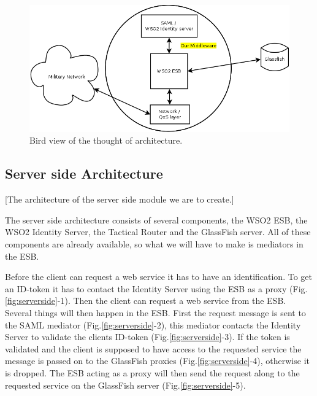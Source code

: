 \documentclass[12pt]{article}
\begin{document}
        \begin{figure}[htb]
            \centering
            \includegraphics[scale=0.3]{birdarch}
            \caption{Bird view of the thought of architecture.}
            \label{fig:birdarch}
        \end{figure}

    \subsection{Server side Architecture}\label{serversidearch} [The architecture of the server side module we are to create.] 
    
        The server side architecture consists of several components, the WSO2 ESB, the WSO2 Identity Server, the Tactical Router and the GlassFish server. All of these components are already available, so what we will have to make is mediators in the ESB.

        Before the client can request a web service it has to have an identification. To get an ID-token it has to contact the Identity Server using the ESB as a proxy (Fig.\ref{fig:serverside}-1). Then the client can request a web service from the ESB. Several things will then happen in the ESB. First the request message is sent to the SAML mediator (Fig.\ref{fig:serverside}-2), this mediator contacts the Identity Server to validate the clients ID-token (Fig.\ref{fig:serverside}-3). If the token is validated and the client is supposed to have access to the requested service the message is passed on to the GlassFish proxies (Fig.\ref{fig:serverside}-4), otherwise it is dropped. The ESB acting as a proxy will then send the request along to the requested service on the GlassFish server (Fig.\ref{fig:serverside}-5).
        
\end{document}
